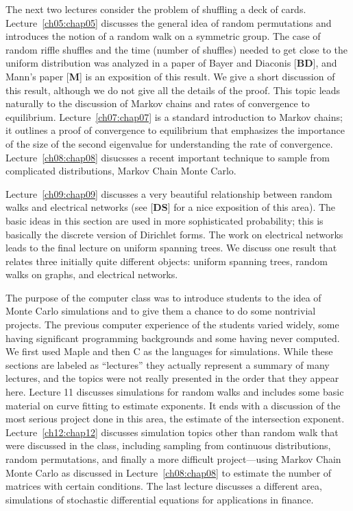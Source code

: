 \documentclass{stml-l}
\theoremstyle{definition}
\numberwithin{equation}{chapter}
\numberwithin{figure}{chapter}
\numberwithin{figure}{section}
\begin{document}
The next two lectures consider the problem of shuffling a deck of cards. Lecture~\ref{ch05:chap05} discusses the general idea of random permutations and introduces the notion of a random walk on a symmetric group. The case of random riffle shuffles and the time (number of shuffles) needed to get close to the uniform distribution was analyzed in a paper of Bayer and Diaconis [\textbf{BD}], and Mann's paper [\textbf{M}] is an exposition of this result. We give a short discussion of this result, although we do not give all the details of the proof. This topic leads naturally to the discussion of Markov chains and rates of convergence to equilibrium. Lecture~\ref{ch07:chap07} is a standard introduction to Markov chains; it outlines a proof of convergence to equilibrium that emphasizes the importance of the size of the second eigenvalue for understanding the rate of convergence. Lecture~\ref{ch08:chap08} disucsses a recent important technique to sample from complicated distributions, Markov Chain Monte Carlo.

Lecture~\ref{ch09:chap09} discusses a very beautiful relationship between random walks and electrical networks (see [\textbf{DS}] for a nice exposition of this area). The basic ideas in this section are used in more sophisticated probability; this is basically the discrete version of Dirichlet forms. The work on electrical networks leads to the final lecture on uniform spanning trees. We discuss one result that relates three initially quite different objects: uniform spanning trees, random walks on graphs, and electrical networks.

The purpose of the computer class was to introduce students to the idea of Monte Carlo simulations and to give them a chance to do some nontrivial projects. The previous computer experience of the students varied widely, some having significant programming backgrounds and some having never computed. We first used Maple and then C as the languages for simulations. While these sections are labeled as ``lectures'' they actually represent a summary of many lectures, and the topics were not really presented in the order that they appear here. Lecture 11 discusses simulations for random walks and includes some basic material on curve fitting to estimate exponents. It ends with a discussion of the most serious project done in this area, the estimate of the intersection exponent. Lecture~\ref{ch12:chap12} discusses simulation topics other than random walk that were discussed in the class, including sampling from continuous distributions, random permutations, and finally a more difficult project---using Markov Chain Monte Carlo as discussed in Lecture~\ref{ch08:chap08} to estimate the number of matrices with certain conditions. The last lecture discusses a different area, simulations of stochastic differential equations for applications in finance.
\end{document}
